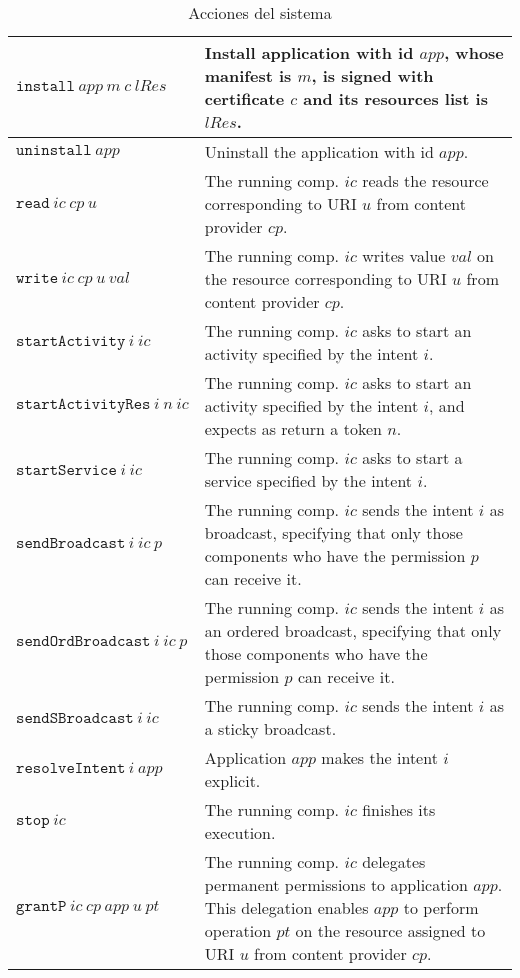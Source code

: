 \begin{table}
\caption{Acciones del sistema}
\label{table:actions}
\vspace{0.2cm}
\small
\begin{tabularx}{\linewidth}{|l X|}
	\hline
	$\mathtt{install}~app~m~c~lRes$	& Install application with id $app$, whose manifest is $m$, is signed with certificate $c$ and its resources list is $lRes$. \\
	\hline
	$\mathtt{uninstall}~app$	& Uninstall the application with id $app$. \\
	\hline
	$\mathtt{read}~ic~cp~u$	& The running comp. $ic$ reads the resource corresponding to URI $u$ from content provider $cp$. \\
	\hline
	$\mathtt{write}~ic~cp~u~val$	& The running comp. $ic$ writes value $val$ on the resource corresponding to URI $u$ from content provider $cp$. \\
	\hline
	$\mathtt{startActivity}~i~ic$	& The running comp. $ic$ asks to start an activity specified by the intent $i$. \\
	\hline
	$\mathtt{startActivityRes}~i~n~ic$	& The running comp. $ic$ asks to start an activity specified by the intent $i$, and expects as return a token $n$. \\
	\hline
	$\mathtt{startService}~i~ic$	& The running comp. $ic$ asks to start a service specified by the intent $i$. \\
	\hline
	$\mathtt{sendBroadcast}~i~ic~p$	& The running comp. $ic$ sends the intent $i$ as broadcast, specifying that only those components who have the permission $p$ can receive it. \\
	\hline
	$\mathtt{sendOrdBroadcast}~i~ic~p$	& The running comp. $ic$ sends the intent $i$ as an ordered broadcast, specifying that only those components who have the permission $p$ can receive it. \\
	\hline
	$\mathtt{sendSBroadcast}~i~ic$	& The running comp. $ic$ sends the intent $i$ as a sticky broadcast. \\
	\hline
	$\mathtt{resolveIntent}~i~app$	& Application $app$ makes the intent $i$ explicit. \\
	\hline
	$\mathtt{stop}~ic$	& The running comp. $ic$ finishes its execution. \\
	\hline
	$\mathtt{grantP}~ic~cp~app~u~pt$	& The running comp. $ic$ delegates permanent permissions to application $app$. This delegation enables $app$ to perform operation $pt$ on the resource assigned to URI $u$ from content provider $cp$. \\

\end{tabularx}
\end{table}
